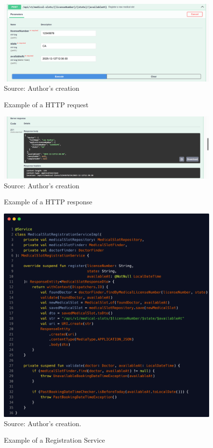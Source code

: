 \begin{figure}[H]
    \caption{Example of a HTTP request}
    \centering
    \includegraphics[width=1\linewidth]{figures/http/http_request.png}
    \label{fig:http-request}
    \footnotesize Source: Author's creation
\end{figure}

\begin{figure}[H]
    \caption{Example of a HTTP response}
    \centering
    \includegraphics[width=1\linewidth]{figures/http/http_response.png}
    \label{fig:http-response}
    \footnotesize Source: Author's creation
\end{figure}

 \begin{figure}[H]
    \centering
    \caption{Example of a Registration Service}
    \includegraphics[width=0.9\linewidth]{figures/medical_slot_registration_service.png}
    \label{fig:medical_slot_registration_service}
    \\ \footnotesize Source: Author's creation.
\end{figure}

